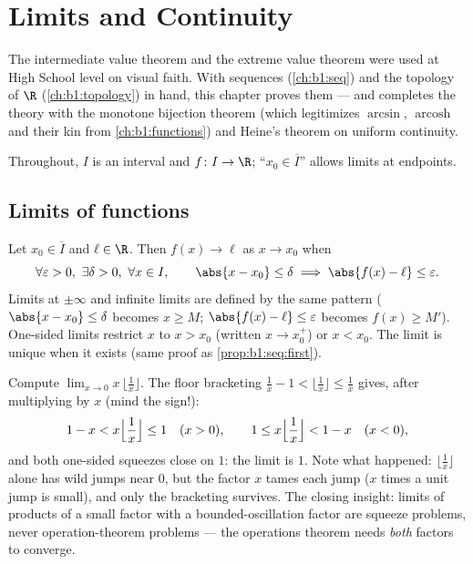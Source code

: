 \chapter{Limits and Continuity}\label{ch:b1:continuity}

The intermediate value theorem and the extreme value theorem were
used at High School level on visual faith. With sequences
(\cref{ch:b1:seq}) and the topology of $\R$ (\cref{ch:b1:topology})
in hand, this chapter proves them --- and completes the theory with
the monotone bijection theorem (which legitimizes $\arcsin$,
$\operatorname{arcosh}$ and their kin from \cref{ch:b1:functions})
and Heine's theorem on uniform continuity.

Throughout, $I$ is an interval and $f \colon I \to \R$; ``$x_0 \in
\overline I$'' allows limits at endpoints.

\section{Limits of functions}

\begin{definition}\label{def:b1:continuity:limit}
Let $x_0 \in \overline{I}$ and $\ell \in \R$. Then $f(x) \to \ell$ as
$x \to x_0$ when
\[
\forall \varepsilon > 0,\ \exists \delta > 0,\ \forall x \in I,
\qquad \abs{x - x_0} \leq \delta \implies \abs{f(x) - \ell} \leq
\varepsilon .
\]
Limits at $\pm\infty$ and infinite limits are defined by the same
pattern ($\abs{x - x_0} \leq \delta$ becomes $x \geq M$; $\abs{f(x) -
\ell} \leq \varepsilon$ becomes $f(x) \geq M'$). One-sided limits
restrict $x$ to $x > x_0$ (written $x \to x_0^+$) or $x < x_0$. The
limit is unique when it exists (same proof as
\cref{prop:b1:seq:first}).
\end{definition}

\begin{example}\label{ex:b1:continuity:floorlimit}
Compute $\lim_{x \to 0} x\,\bigl\lfloor \frac1x \bigr\rfloor$.
The floor bracketing $\frac1x - 1 < \lfloor \frac1x \rfloor \leq
\frac1x$ gives, after multiplying by $x$ (mind the sign!):
\[
1 - x < x\Bigl\lfloor \frac1x \Bigr\rfloor \leq 1 \quad (x > 0),
\qquad
1 \leq x\Bigl\lfloor \frac1x \Bigr\rfloor < 1 - x \quad (x < 0),
\]
and both one-sided squeezes close on $1$: the limit is $1$. Note
what happened: $\lfloor \frac1x\rfloor$ alone has wild jumps near
$0$, but the factor $x$ tames each jump ($x$ times a unit jump is
small), and only the bracketing survives. The closing insight:
limits of products of a small factor with a bounded-oscillation
factor are squeeze problems, never operation-theorem problems ---
the operations theorem needs \emph{both} factors to converge.
\end{example}

